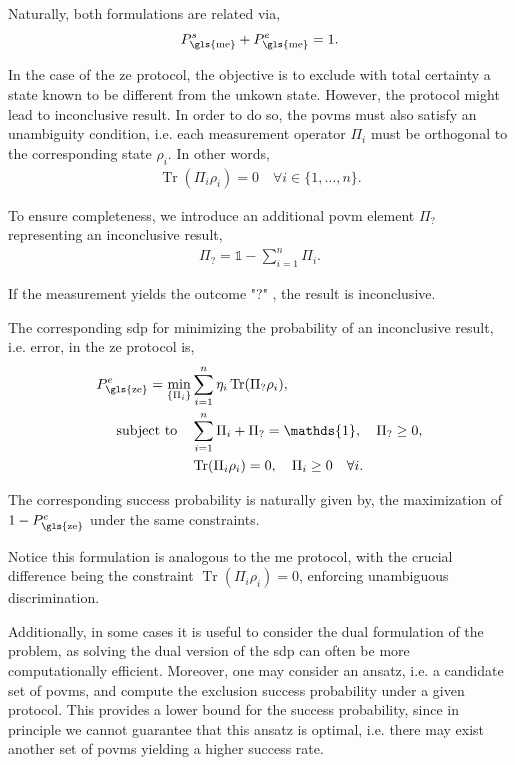 \documentclass[12pt,letterpaper]{article}
\DeclareMathOperator{\tr}{Tr}
\begin{document}
Naturally, both formulations are related via,
\begin{align*}
P_{\text{\gls{me}}}^s + P_{\text{\gls{me}}}^e = 1.
\end{align*}

In the case of the \gls{ze} protocol, the objective is to exclude with total certainty a state known to be different from the unkown state. However, the protocol might lead to inconclusive result. In order to do so, the \gls{povm}s must also satisfy an unambiguity condition, i.e. each measurement operator $\Pi_i$ must be orthogonal to the corresponding state $\rho_i$. In other words,
\begin{align*}
\tr(\Pi_i \rho_i) = 0 \quad \forall i \in \{1, \dots, n\}.
\end{align*}

To ensure completeness, we introduce an additional \gls{povm} element $\Pi_?$ representing an inconclusive result,
\begin{align*}
\Pi_? = \mathds{1} - \sum_{i=1}^n \Pi_i.
\end{align*}

If the measurement yields the outcome "?" , the result is inconclusive.

The corresponding \gls{sdp} for minimizing the probability of an inconclusive result, i.e. error, in the \gls{ze} protocol is,
\begin{align*}
	P_{\text{\gls{ze}}}^e = \min_{\left\{\Pi_i\right\}} &\sum_{i=1}^n \eta_i\tr(\Pi_? \rho_i),\\
	\text{subject to} \quad & \sum_{i=1}^n \Pi_i + \Pi_? = \mathds{1}, \quad \Pi_? \geq 0,\\
	& \tr(\Pi_i \rho_i) = 0, \quad \Pi_i \geq 0 \quad \forall i.
\end{align*}

The corresponding success probability is naturally given by, the maximization of $1-P_{\text{\gls{ze}}}^e$ under the same constraints.

Notice this formulation is analogous to the \gls{me} protocol, with the crucial difference being the constraint $\tr(\Pi_i \rho_i) = 0$, enforcing unambiguous discrimination.

Additionally, in some cases it is useful to consider the dual formulation of the problem, as solving the dual version of the \gls{sdp} can often be more computationally efficient. Moreover, one may consider an ansatz, i.e. a candidate set of \gls{povm}s, and compute the exclusion success probability under a given protocol. This provides a lower bound for the success probability, since in principle we cannot guarantee that this ansatz is optimal, i.e. there may exist another set of \gls{povm}s yielding a higher success rate.
\end{document}
